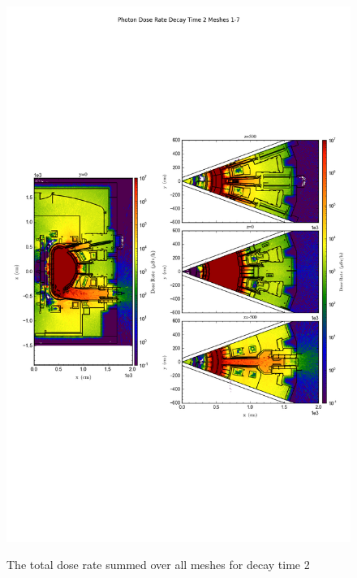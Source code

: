 \documentclass[12pt]{article}
\begin{document}
\begin{figure}[ht!]
\centering
\includegraphics[trim={0cm 9cm 0cm 10cm},clip,scale=0.75]{../plots/final_model/Photon_Dose_Rate_Decay_Time_2_Meshes_1-7.png}
\label{fig:photons_dc2_no4bc_total}
\caption{The total dose rate summed over all meshes for decay time 2}
\end{figure}
\end{document}
